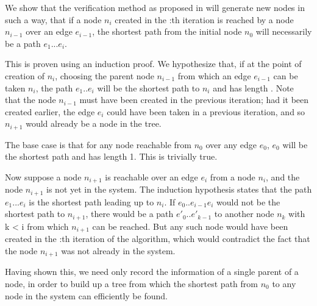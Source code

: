 We show that the verification method as proposed in  will generate new nodes in such a way, that if a node $n_{i}$ created in the :th iteration is reached by a node $n_{i-1}$ over an edge $e_{i-1}$, the shortest path from the initial node $n_0$ will necessarily be a path $e_1...e_i$.
 
 This is proven using an induction proof. We hypothesize that, if at the point of creation of $n_i$, choosing the parent node $n_{i-1}$ from which an edge $e_{i-1}$ can be taken $n_i$, the path $e_1..e_{i}$ will be the shortest path to $n_i$ and has length . Note that the node $n_{i-1}$ must have been created in the previous iteration; had it been created earlier, the edge $e_i$ could have been taken in a previous iteration, and so $n_{i+1}$ would already be a node in the tree.
 
The base case is that for any node reachable from $n_0$ over any edge $e_0$, $e_0$ will be the shortest path and has length 1. This is trivially true.
 
Now suppose a node $n_{i+1}$ is reachable over an edge $e_i$ from a node $n_i$, and the node $n_{i+1}$ is not yet in the system. The induction hypothesis states that the path $e_1...e_i$ is the shortest path leading up to $n_i$. If $e_0..e_{i-1}e_i$ would not be the shortest path to $n_{i+1}$, there would be a path $e'_0..e'_{k-1}$ to another node $n_k$ with k < i from which $n_{i+1}$ can be reached. But any such node would have been created in the :th iteration of the algorithm, which would contradict the fact that the node $n_{i+1}$ was not already in the system.
 
Having shown this, we need only record the information of a single parent of a node, in order to build up a tree from which the shortest path from $n_0$ to any node in the system can efficiently be found.

